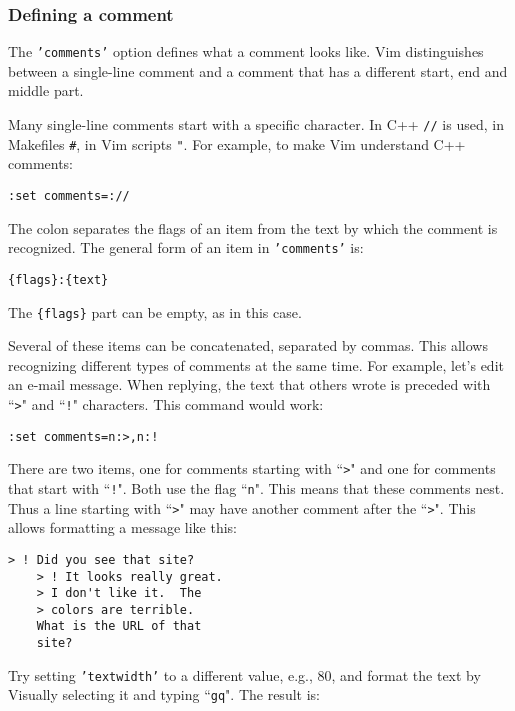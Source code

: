 \subsubsection{Defining a comment}
The \texttt{'comments'} option defines what a comment looks like.
Vim distinguishes between a single-line comment and a comment that has a different start, end and middle part.

Many single-line comments start with a specific character.
In C++ \texttt{//} is used, in Makefiles \texttt{\#}, in Vim scripts \texttt{"}.
For example, to make Vim understand C++ comments:

\begin{Verbatim}[samepage=true]
 :set comments=://
\end{Verbatim}

The colon separates the flags of an item from the text by which the comment is recognized.
The general form of an item in \texttt{'comments'} is:

\begin{Verbatim}[samepage=true]
    {flags}:{text}
\end{Verbatim}

The \texttt{\{flags\}} part can be empty, as in this case.

Several of these items can be concatenated, separated by commas.
This allows recognizing different types of comments at the same time.
For example, let's edit an e-mail message.
When replying, the text that others wrote is preceded with ``\texttt{>}" and ``\texttt{!}" characters.
This command would work:

\begin{Verbatim}[samepage=true]
 :set comments=n:>,n:!
\end{Verbatim}

There are two items, one for comments starting with ``\texttt{>}" and one for comments that start with ``\texttt{!}".
Both use the flag ``\texttt{n}".
This means that these comments nest.
Thus a line starting with ``\texttt{>}" may have another comment after the ``\texttt{>}".
This allows formatting a message like this:

\begin{Verbatim}[samepage=true]
    > ! Did you see that site?
    > ! It looks really great.
    > I don't like it.  The
    > colors are terrible.
    What is the URL of that
    site?
\end{Verbatim}

Try setting \texttt{'textwidth'} to a different value, e.g., 80, and format the text by Visually selecting it and typing ``\texttt{gq}".
The result is:


